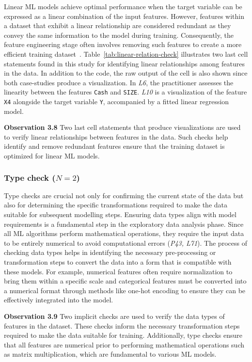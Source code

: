 \documentclass[journal]{IEEEtran}       %
\newcommand{\highlight}[1]{
  \begin{framed}%
    \noindent#1
\end{framed}}
\begin{document}
Linear ML models achieve optimal performance when the target variable
can be expressed as a linear combination of the input features.
However, features within a dataset that exhibit a linear relationship
are considered redundant as they convey the same information to the
model during training. Consequently, the feature engineering stage
often involves removing such features to create a more efficient
training dataset~\cite{shome2022data}.
Table~\ref{tab:linear-relation-check} illustrates two last cell
statements found in this study for identifying linear relationships
among features in the data. In addition to the code, the raw output
of the cell is also shown since both case-studies produce a
visualization.  In \emph{L6}, the practitioner assesses the linearity
between the features \texttt{Cash} and \texttt{SIZE}. \emph{L10} is a
visualization of the feature \texttt{X4} alongside the target
variable \texttt{Y}, accompanied by a fitted linear regression model.

\highlight{\textbf{Observation 3.8} Two last cell statements that
  produce visualizations are used to verify linear relationships
  between features in the data. Such checks help identify and remove
  redundant features ensure that the training dataset is optimized for
linear ML models.}

\subsubsection{Type check ($N = 2$)}

Type checks are crucial not only for confirming the current state of
the data but also for determining the specific transformations
required to make the data suitable for subsequent modelling steps.
Ensuring data types align with model requirements is a fundamental
step in the exploratory data analysis phase. Since all ML algorithms
perform mathematical operations, they require the input data to be
entirely numerical to avoid computational errors (\emph{P43, L71}).
The process of checking data types helps in identifying the necessary
pre-processing or transformation steps to convert the data into a
form that is compatible with these models. For example, numerical
features often require normalization to bring them within a specific
scale and categorical features must be converted into a numerical
format through methods like one-hot encoding to ensure they can be
effectively integrated into the model.

\highlight{\textbf{Observation 3.9} Two implicit checks are used to
  verify the data types of features in the dataset. These checks inform
  the necessary transformation steps required to make the data suitable
  for training. Additionally, type checks ensure that all features are
  numerical prior to performing mathematical operations such as matrix
multiplication, which are fundamental to various ML models.}
\end{document}
